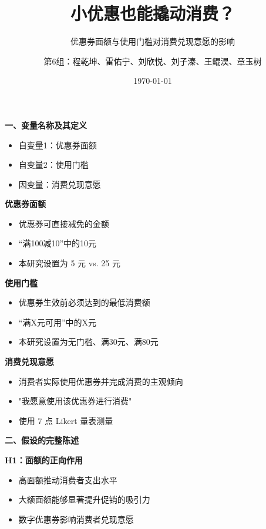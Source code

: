 \documentclass[aspectratio=169,UTF8,zihao=-4]{ctexbeamer}
\title{小优惠也能撬动消费？}
\subtitle{优惠券面额与使用门槛对消费兑现意愿的影响}
\author{第6组：程乾坤、雷佑宁、刘欣悦、刘子溱、王鲲淏、章玉树}
\date{\today}
\newcommand{\bigidea}[1]{
  \begin{center}
    \vspace{0.8em}
    {\LARGE \bfseries #1}
    \vspace{0.6em}
  \end{center}
}
\newcommand{\sectionpageframe}[1]{
  \begin{frame}[plain]
    \begin{center}
      \vfill
      {\Huge \bfseries #1}
      \vfill
    \end{center}
  \end{frame}
}
\begin{document}
\begin{frame}[plain]
  \titlepage
\end{frame}

\sectionpageframe{一、变量名称及其定义}

\begin{frame}
  \begin{itemize}
    \item \Large 自变量1：优惠券面额
    \item \Large 自变量2：使用门槛
    \item \Large 因变量：消费兑现意愿
  \end{itemize}
\end{frame}

\begin{frame}
  \bigidea{优惠券面额}
  \begin{itemize}
    \item \Large 优惠券可直接减免的金额
    \item \Large “满100减10”中的10元
    \item \Large 本研究设置为 5 元 vs. 25 元
  \end{itemize}
\end{frame}

\begin{frame}
  \bigidea{使用门槛}
  \begin{itemize}
    \item \Large 优惠券生效前必须达到的最低消费额
    \item \Large “满X元可用”中的X元
    \item \Large 本研究设置为无门槛、满30元、满80元
  \end{itemize}
\end{frame}

\begin{frame}
  \bigidea{消费兑现意愿}
  \begin{itemize}
    \item \Large 消费者实际使用优惠券并完成消费的主观倾向
    \item \Large "我愿意使用该优惠券进行消费"
    \item \Large 使用 7 点 Likert 量表测量
  \end{itemize}
\end{frame}

\sectionpageframe{二、假设的完整陈述}

\begin{frame}
  \bigidea{H1：面额的正向作用}
  \begin{itemize}
    \item \Large 高面额推动消费者支出水平
    \item \Large 大额面额能够显著提升促销的吸引力
    \item \Large 数字优惠券影响消费者兑现意愿
  \end{itemize}
\end{frame}
\end{document}
